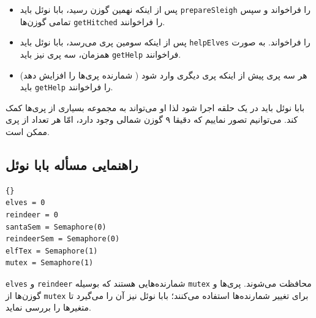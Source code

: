 \documentclass{book}
\newcommand{\clearemptydoublepage}{\newpage\cleardoublepage}
\begin{document}
\begin {itemize}

\item 
    پس از اینکه نهمین گوزن رسید، بابا نوئل باید {\tt prepareSleigh} را فراخواند و سپس تمامی گوزن‌ها  {\tt getHitched} را فراخوانند. 

\item 
    پس از اینکه سومین پری می‌رسد، بابا نوئل باید  {\tt helpElves} را فراخواند. به صورت همزمان، سه پری نیز باید {\tt getHelp} فراخوانند. 

\item 
    هر سه پری پیش از اینکه پری دیگری وارد شود ( شمارنده پری‌ها را افزایش دهد) باید {\tt getHelp} را فراخوانند.

\end {itemize}

    بابا نوئل باید در یک حلقه اجرا شود لذا او می‌تواند به مجموعه بسیاری از پری‌ها کمک کند. می‌توانیم تصور نماییم که دقیقا ۹ گوزن شمالی وجود دارد، امّا 
    هر تعداد از پری ممکن است. 

\clearemptydoublepage
\subsection {راهنمایی مسأله بابا نوئل}

\begin{latin}
\begin{lstlisting}[title=\rl{راهنمایی مسأله بابا نوئل}]{}
elves = 0
reindeer = 0
santaSem = Semaphore(0)
reindeerSem = Semaphore(0)
elfTex = Semaphore(1)
mutex = Semaphore(1)
\end{lstlisting}
\end{latin}

    {\tt elves} و {\tt reindeer} شمارنده‌هایی هستند که بوسیله {\tt mutex} محافظت می‌شوند. 
    پری‌ها و گوزن‌‌ها از {\tt mutex} برای تغییر شمارنده‌ها استفاده می‌کنند؛‌ بابا نوئل نیز آن را می‌گیرد تا متغیرها را بررسی نماید.
\end{document}
